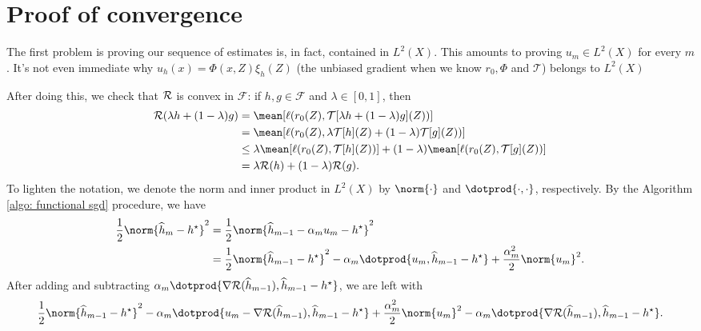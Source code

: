\section{Proof of convergence}

The first problem is proving our sequence of estimates is, in fact, contained in $ L^{ 2 } ( X ) $.
This amounts to proving $ u_{ m } \in L^{ 2 } ( X ) $ for every $ m $.
It's not even immediate why $ u_{ h } ( x ) = \Phi ( x, Z ) \xi_{ h } ( Z ) $ (the unbiased gradient when we know $ r_{ 0 }, \Phi $ and $ \mathcal{T} $) belongs to $ L^{ 2 } ( X ) $

After doing this, we check that $ \mathcal{R} $ is convex in $ \mathcal{F} $:
if $ h, g \in \mathcal{F} $ and $ \lambda \in [ 0, 1 ] $, then
\begin{align*}
    \risk ( \lambda h + ( 1 - \lambda ) g )
    &= \mean [ \loss ( r_{ 0 } ( Z ), \mathcal{T} [ \lambda h + ( 1 - \lambda ) g ] ( Z ) ) ] \\
    &= \mean [ \loss ( r_{ 0 } ( Z ), \lambda \mathcal{T} [ h ] ( Z ) + ( 1 - \lambda ) \mathcal{T} [ g ] ( Z ) ) ] \\
    &\leq \lambda \mean [ \loss ( r_{ 0 } ( Z ), \mathcal{T} [ h ] ( Z ) ) ] + ( 1 - \lambda ) \mean [ \loss ( r_{ 0 } ( Z ), \mathcal{T} [ g ] ( Z ) ) ] \\
    &= \lambda \risk ( h ) + ( 1 - \lambda ) \risk ( g )
.\end{align*}
To lighten the notation, we denote the norm and inner product in $ L^{ 2 } ( X ) $ by $ \norm{ \cdot } $ and $ \dotprod{ \cdot, \cdot } $, respectively.
By the Algorithm \ref{algo: functional sgd} procedure, we have
\begin{align*}
    \frac{ 1 }{ 2 } \norm{ \hat{ h }_{ m } - \hstar }^2
    &= \frac{ 1 }{ 2 } \norm{ \hat{ h }_{ m-1 } - \alpha_{ m } u_{ m } - \hstar }^2 \\
    &= \frac{ 1 }{ 2 } \norm{ \hat{ h }_{ m-1 } - \hstar }^2
    - \alpha_{ m } \dotprod{ u_{ m }, \hat{ h }_{ m-1 } - \hstar }
    + \frac{ \alpha_{ m }^2 }{ 2 } \norm{ u_{ m } }^2
.\end{align*}
After adding and subtracting $ \alpha_{ m } \dotprod{ \nabla \risk ( \hat{ h }_{ m-1 } ), \hat{ h }_{ m-1 } - \hstar } $, we are left with
\begin{equation*}
    \frac{ 1 }{ 2 } \norm{ \hat{ h }_{ m-1 } - \hstar }^2
    - \alpha_{ m } \dotprod{ u_{ m } - \nabla \risk ( \hat{ h }_{ m-1 } ), \hat{ h }_{ m-1 } - \hstar }
    + \frac{ \alpha_{ m }^2 }{ 2 } \norm{ u_{ m } }^2
    - \alpha_{ m } \dotprod{ \nabla \risk ( \hat{ h }_{ m-1 } ), \hat{ h }_{ m-1 } - \hstar }
.\end{equation*}
